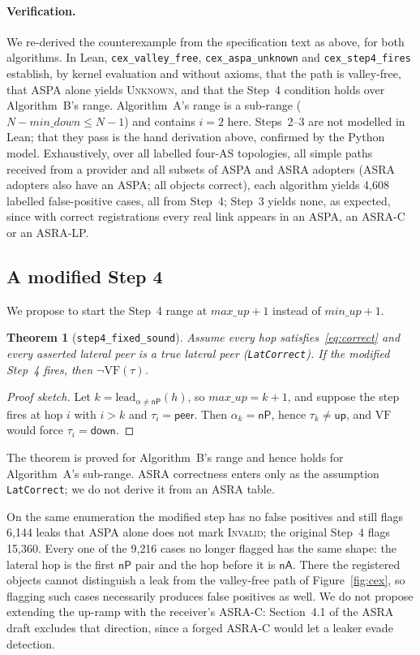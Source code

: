 \documentclass[11pt,a4paper]{article}
\newtheorem{theorem}{Theorem}
\theoremstyle{definition}
\theoremstyle{remark}
\newcommand{\nP}{\mathsf{nP}}     %
\newcommand{\nA}{\mathsf{nA}}     %
\newcommand{\up}{\mathsf{up}}
\newcommand{\down}{\mathsf{down}}
\newcommand{\peer}{\mathsf{peer}}
\newcommand{\Invalid}{\textup{\textsc{Invalid}}}
\newcommand{\Unknown}{\textup{\textsc{Unknown}}}
\newcommand{\maxup}{\mathit{max\_up}}
\newcommand{\minup}{\mathit{min\_up}}
\newcommand{\mindown}{\mathit{min\_down}}
\newcommand{\lead}{\mathrm{lead}}
\newcommand{\VF}{\mathrm{VF}}
\newcommand{\lean}[1]{\texttt{#1}}
\begin{document}
\paragraph{Verification.}
We re-derived the counterexample from the specification text as above, for both algorithms. In Lean,
\lean{cex\_valley\_free}, \lean{cex\_aspa\_unknown} and \lean{cex\_step4\_fires} establish, by kernel
evaluation and without axioms, that the path is valley-free, that ASPA alone yields \Unknown, and that the
Step~4 condition holds over Algorithm~B's range. Algorithm~A's range is a sub-range
($N-\mindown\le N-1$) and contains $i=2$ here. Steps~2--3 are not modelled in Lean; that they pass is the
hand derivation above, confirmed by the Python model. Exhaustively, over all labelled four-AS topologies,
all simple paths received from a provider and all subsets of ASPA and ASRA adopters (ASRA adopters also
have an ASPA; all objects correct), each algorithm yields 4{,}608 labelled false-positive cases, all from
Step~4; Step~3 yields none, as expected, since with correct registrations every real link appears in an
ASPA, an ASRA-C or an ASRA-LP.

\subsection{A modified Step 4}
\label{sec:fix}
We propose to start the Step~4 range at $\maxup+1$ instead of $\minup+1$.

\begin{theorem}[\lean{step4\_fixed\_sound}]
Assume every hop satisfies~\eqref{eq:correct} and every asserted lateral peer is a true lateral peer
(\lean{LatCorrect}). If the modified Step~4 fires, then $\neg\VF(\tau)$.
\end{theorem}
\begin{proof}[Proof sketch]
Let $k=\lead_{\alpha\neq\nP}(h)$, so $\maxup=k+1$, and suppose the step fires at hop $i$ with $i>k$ and
$\tau_i=\peer$. Then $\alpha_k=\nP$, hence $\tau_k\neq\up$, and $\VF$ would force $\tau_i=\down$.
\end{proof}
\noindent The theorem is proved for Algorithm~B's range and hence holds for Algorithm~A's sub-range.
ASRA correctness enters only as the assumption \lean{LatCorrect}; we do not derive it from an ASRA table.

On the same enumeration the modified step has no false positives and still flags 6{,}144 leaks that ASPA
alone does not mark \Invalid; the original Step~4 flags 15{,}360. Every one of the 9{,}216 cases no longer
flagged has the same shape: the lateral hop is the first $\nP$ pair and the hop before it is $\nA$. There the
registered objects cannot distinguish a leak from the valley-free path of Figure~\ref{fig:cex}, so flagging
such cases necessarily produces false positives as well. We do not propose extending the up-ramp with the
receiver's ASRA-C: Section~4.1 of the ASRA draft excludes that direction, since a forged ASRA-C would let a
leaker evade detection.
\end{document}
